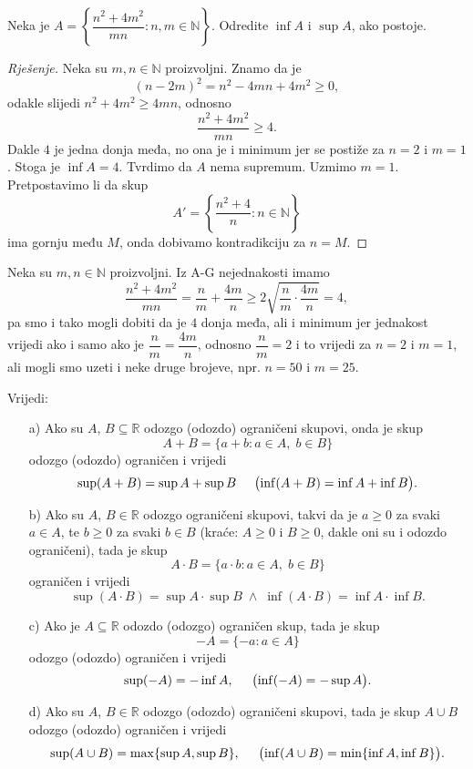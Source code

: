 \begin{exercise}
Neka je $A=\left\{\dfrac{n^2+4m^2}{mn} : n, m\in \mathbb{N}\right\}$. Odredite $\inf{A}$ i $\sup{A}$, ako postoje.
\end{exercise}
\begin{proof}[Rješenje]
Neka su $m, n\in \mathbb{N}$ proizvoljni. Znamo da je $$(n-2m)^2=n^2-4mn+4m^2\geq 0,$$
odakle slijedi $n^2+4m^2\geq 4mn$, odnosno $$\dfrac{n^2+4m^2}{mn}\geq 4.$$ Dakle $4$ je jedna donja međa, no ona je i minimum jer se postiže za $n=2$ i $m=1$. Stoga je $\inf{A}=4$. Tvrdimo da $A$ nema supremum. Uzmimo $m=1$. Pretpostavimo li da skup $$A'=\left\{\dfrac{n^2+4}{n} : n\in \mathbb{N}\right\}$$ ima gornju među $M$, onda dobivamo kontradikciju za $n=M$.
\end{proof}
\begin{remark}
Neka su $m, n\in \mathbb{N}$ proizvoljni. Iz A-G nejednakosti imamo
$$\dfrac{n^2+4m^2}{mn}=\dfrac{n}{m}+\dfrac{4m}{n}\geq 2\sqrt{\dfrac{n}{m}\cdot \dfrac{4m}{n}}=4,$$
pa smo i tako mogli dobiti da je $4$ donja međa, ali i minimum jer jednakost vrijedi ako i samo ako je $\dfrac{n}{m}=\dfrac{4m}{n}$, odnosno $\dfrac{n}{m}=2$ i to vrijedi za $n=2$ i $m=1$, ali mogli smo uzeti i neke druge brojeve, npr. $n=50$ i $m=25$.
\end{remark}

\begin{remark}
\label{prodsumsupinf}
Vrijedi:
\begin{itemize}
\item[a)] Ako su $A$, $B\subseteq \mathbb{R}$ odozgo (odozdo) ograničeni skupovi, onda je skup
$$A+B=\{a+b : a\in A,\; b\in B\}$$
odozgo (odozdo) ograničen i vrijedi
$$\sup(A+B)=\sup{A}+\sup{B}\hspace{0.5cm}\left(\inf(A+B)=\inf{A}+\inf{B}\right).$$
\item[b)] Ako su $A$, $B\in \mathbb{R}$ odozgo ograničeni skupovi, takvi da je $a\geq 0$ za svaki $a\in A$, te $b\geq 0$ za svaki $b\in B$ (kraće: $A\geq 0$ i $B\geq 0$, dakle oni su i odozdo ograničeni), tada je skup
$$A\cdot B=\{a\cdot b : a\in A,\; b\in B\}$$
ograničen i vrijedi
$$\sup(A\cdot B)=\sup{A}\cdot \sup{B} \; \wedge \; \inf(A\cdot B)=\inf{A}\cdot \inf{B}.$$
\item[c)] Ako je $A\subseteq \mathbb{R}$ odozdo (odozgo) ograničen skup, tada je skup
$$-A=\{-a : a\in A\}$$
odozgo (odozdo) ograničen i vrijedi
$$\sup(-A)=-\inf{A}, \hspace{0.5cm} \left(\inf(-A)=-\sup{A}\right).$$
\item[d)] Ako su $A$, $B\in \mathbb{R}$ odozgo (odozdo) ograničeni skupovi, tada je skup $A\cup B$ odozgo (odozdo) ograničen i vrijedi
$$\sup(A\cup B)=\max\{\sup{A},\sup{B}\},\hspace{0.5cm} \left(\inf(A\cup B)=\min\{\inf{A}, \inf{B}\}\right).$$
\end{itemize}
\end{remark}

